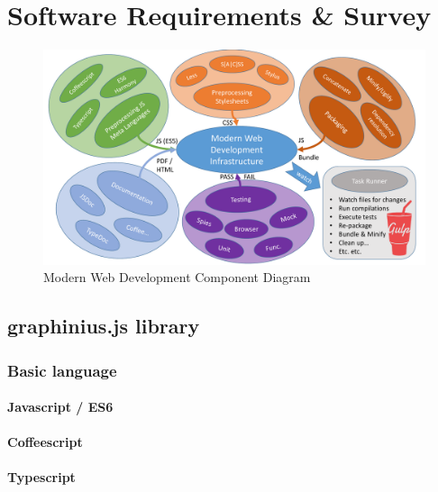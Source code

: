 \chapter{Software Requirements \& Survey}
\label{ch:software_requirements}


\begin{landscape}
\begin{figure}[ht]
	\label{fig_grunt_gulp}
	\centering
	\hspace*{-1cm}
	\vspace*{1cm}
	\includegraphics[width=1.8\textwidth]{figures/Modern_Web_Dev}
	\caption{Modern Web Development Component Diagram}
\end{figure}
\end{landscape}


\section{graphinius.js library}
\label{library}

	\subsection{Basic language}
	\label{ssect:language}
	
		\subsubsection{Javascript / ES6}
		\label{sssect:js_es6}
		
		\subsubsection{Coffeescript}
		\label{sssect:coffeescript}
		
		\subsubsection{Typescript}
		\label{sssect:typescript}
	
